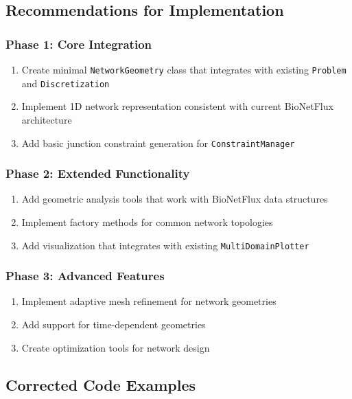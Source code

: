 \subsection{Recommendations for Implementation}

\subsubsection{Phase 1: Core Integration}

\begin{enumerate}
    \item Create minimal \texttt{NetworkGeometry} class that integrates with existing \texttt{Problem} and \texttt{Discretization}
    \item Implement 1D network representation consistent with current BioNetFlux architecture
    \item Add basic junction constraint generation for \texttt{ConstraintManager}
\end{enumerate}

\subsubsection{Phase 2: Extended Functionality}

\begin{enumerate}
    \item Add geometric analysis tools that work with BioNetFlux data structures
    \item Implement factory methods for common network topologies
    \item Add visualization that integrates with existing \texttt{MultiDomainPlotter}
\end{enumerate}

\subsubsection{Phase 3: Advanced Features}

\begin{enumerate}
    \item Implement adaptive mesh refinement for network geometries
    \item Add support for time-dependent geometries
    \item Create optimization tools for network design
\end{enumerate}

\subsection{Corrected Code Examples}

